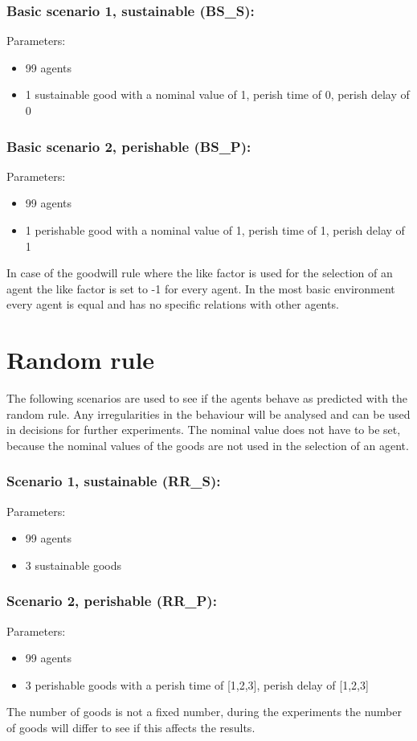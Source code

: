 \documentclass[twoside,openright]{uva-bachelor-thesis}
\begin{document}
\subsubsection{Basic scenario 1, sustainable (BS\_S):}
Parameters:
\begin{itemize}
\item	99 agents
\item	1 sustainable good with a nominal value of 1, perish time of 0, perish delay of 0
\end{itemize}
\subsubsection{Basic scenario 2, perishable (BS\_P):}
Parameters:
\begin{itemize}
\item	99 agents
\item	1 perishable good with a nominal value of 1, perish time of 1, perish delay of 1
\end{itemize}
In case of the goodwill rule where the like factor is used for the selection of an agent the like factor is set to -1 for every agent. In the most basic environment every agent is equal and has no specific relations with other agents.

\section{Random rule}
The following scenarios are  used to see if the agents behave as predicted with the random rule.  Any irregularities in the behaviour will be analysed and can be used in decisions for further experiments. The nominal value does not have to be set, because the nominal values of the goods are not used in the selection of an agent.
\subsubsection{Scenario 1, sustainable (RR\_S):}
Parameters:
\begin{itemize}
\item	99 agents
\item	3 sustainable goods
\end{itemize}
\subsubsection{Scenario 2, perishable (RR\_P):}
Parameters:
\begin{itemize}
\item	99 agents
\item	3 perishable goods with a perish time of [1,2,3], perish delay of [1,2,3]
\end{itemize}
The number of goods is not a fixed number, during the experiments the number of goods will differ to see if this affects the results.
\end{document}
